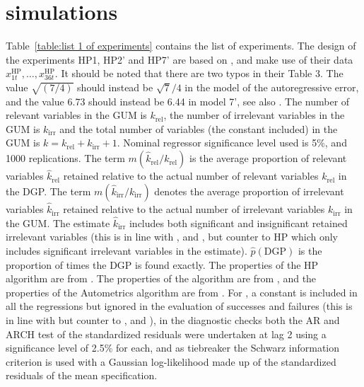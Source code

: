 \documentclass[article,nojss]{jss}
\begin{document}
\newpage
\appendix
\section[Hoover and Perez (1999) simulations]{\cite{Hooveretal99} simulations} \label{appendix} 

Table~\ref{table:list 1 of experiments} contains the list of
experiments.  The design of the experiments HP1, HP2' and HP7' are
based on \citet[][see Table 3 on p.~174]{Hooveretal99}, and make use
of their data $x_{1t}^{\text{HP}},\ldots,x_{36t}^{\text{HP}}$. It
should be noted that there are two typos in their Table 3. The value
$\sqrt{(7/4)}$ should instead be $\sqrt{7}/4$ in the model of the
autoregressive error, and the value 6.73 should instead be 6.44 in
model 7', see also \citet{Doornik2009}. The number of relevant
variables in the GUM is $k_{\text{rel}}$, the number of irrelevant
variables in the GUM is $k_{\text{irr}}$ and the total number of
variables (the constant included) in the GUM is
$k = k_{\text{rel}} + k_{\text{irr}} + 1$. Nominal regressor
significance level used is 5\%, and 1000
replications. The term $m(\hat{k}_{\text{rel}}/k_{\text{rel}})$ is the average
proportion of relevant variables $\hat{k}_{\text{rel}}$ retained
relative to the actual number of relevant variables $k_{\text{rel}}$
in the DGP. The term $m(\hat{k}_{\text{irr}}/k_{\text{irr}})$ denotes the average
proportion of irrelevant variables $\hat{k}_{\text{irr}}$ retained
relative to the actual number of irrelevant variables $k_{\text{irr}}$
in the GUM. The estimate $\hat{k}_{\text{irr}}$ includes both
significant and insignificant retained irrelevant variables (this is
in line with \citet{HendryKrolzig2005}, and \citet{Doornik2009}, but
counter to HP which only includes significant irrelevant variables in
the estimate). $\hat{p}(\text{DGP})$ is the proportion of times the
DGP is found exactly. The properties of the HP algorithm are from
\citet[][Table 4 on p.~179]{Hooveretal99}. The properties of the
 algorithm are from \citet[][Figure 1 on
p.~C39]{HendryKrolzig2005}, and the properties of the Autometrics
algorithm are from \citet[][Section 6]{Doornik2009}. For
, a constant is included in all the regressions but
ignored in the evaluation of successes and failures (this is in line
with \citet{Hooveretal99} but counter to \citet{HendryKrolzig2005},
and \citet{Doornik2009}), in the diagnostic checks both the AR and
ARCH test of the standardized residuals were undertaken at lag 2 using
a significance level of 2.5\% for each, and as tiebreaker the Schwarz
information criterion is used with a Gaussian log-likelihood made up
of the standardized residuals of the mean specification.
\end{document}
